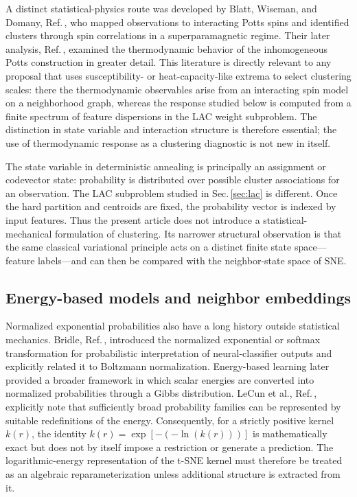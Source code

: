 \documentclass[11pt,a4paper]{article}
\theoremstyle{definition}
\theoremstyle{plain}
\begin{document}
A distinct statistical-physics route was developed by Blatt, Wiseman, and Domany, Ref.\,\cite{blatt1996spc}, who mapped observations to interacting Potts spins and identified clusters through spin correlations in a superparamagnetic regime. Their later analysis, Ref.\,\cite{wiseman1998spc}, examined the thermodynamic behavior of the inhomogeneous Potts construction in greater detail. This literature is directly relevant to any proposal that uses susceptibility- or heat-capacity-like extrema to select clustering scales: there the thermodynamic observables arise from an interacting spin model on a neighborhood graph, whereas the response studied below is computed from a finite spectrum of feature dispersions in the LAC weight subproblem. The distinction in state variable and interaction structure is therefore essential; the use of thermodynamic response as a clustering diagnostic is not new in itself.

The state variable in deterministic annealing is principally an assignment or codevector state: probability is distributed over possible cluster associations for an observation. The LAC subproblem studied in Sec.\,\ref{sec:lac} is different. Once the hard partition and centroids are fixed, the probability vector is indexed by input features. Thus the present article does not introduce a statistical-mechanical formulation of clustering. Its narrower structural observation is that the same classical variational principle acts on a distinct finite state space---feature labels---and can then be compared with the neighbor-state space of SNE.

\subsection{Energy-based models and neighbor embeddings}
\label{subsec:ebm_related}

Normalized exponential probabilities also have a long history outside statistical mechanics. Bridle, Ref.\,\cite{bridle1990softmax}, introduced the normalized exponential or softmax transformation for probabilistic interpretation of neural-classifier outputs and explicitly related it to Boltzmann normalization. Energy-based learning later provided a broader framework in which scalar energies are converted into normalized probabilities through a Gibbs distribution. LeCun et al., Ref.\,\cite{lecun2006ebm}, explicitly note that sufficiently broad probability families can be represented by suitable redefinitions of the energy. Consequently, for a strictly positive kernel $k(r)$, the identity $k(r)=\exp\left[-(-\ln\left(k(r)\right))\right]$ is mathematically exact but does not by itself impose a restriction or generate a prediction. The logarithmic-energy representation of the t-SNE kernel must therefore be treated as an algebraic reparameterization unless additional structure is extracted from it.
\end{document}

